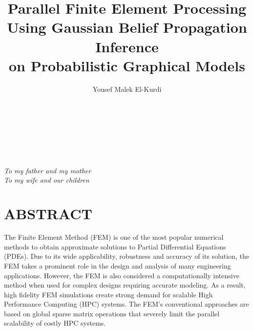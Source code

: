 \documentclass [12pt,letterpaper]{report}
\begin{document}

\title{\vspace{-2cm}Parallel Finite Element Processing\\ Using Gaussian Belief Propagation Inference\\ on Probabilistic Graphical Models}
\author{Yousef Malek El-Kurdi}
\date{\Month\ \number\year}

\maketitle

\raggedbottom
\doublespacing
{}

\section*{~}
\thispagestyle{empty}%
\begin{center}
\slshape
To my father and my mother\\
To my wife and our children
\end{center}

\newpage

\section*{\centering \MakeUppercase{Abstract}}

The Finite Element Method (FEM) is one of the most popular numerical methods to obtain approximate solutions to Partial Differential Equations (PDEs).
Due to its wide applicability, robustness and accuracy of its solution, the FEM takes a prominent role in the design and analysis of many engineering applications.
However, the FEM is also considered a computationally intensive method when used for complex designs requiring accurate modeling.
As a result, high fidelity FEM simulations create strong demand for scalable High Performance Computing (HPC) systems.
The FEM's conventional approaches are based on global sparse matrix operations that severely limit the parallel scalability of costly HPC systems.
\end{document}
